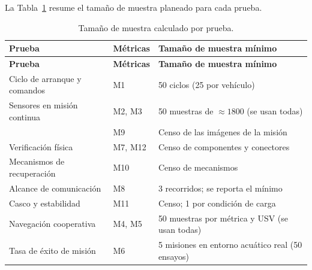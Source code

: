 \newpage

La Tabla~\ref{tab:muestras} resume el tamaño de muestra planeado para cada prueba.

\begin{longtable}{|p{4.6cm}|>{\centering\arraybackslash}p{2cm}|p{6.2cm}|}
\caption{Tamaño de muestra calculado por prueba.}
\label{tab:muestras} \\
\hline
\textbf{Prueba} & \textbf{Métricas} & \textbf{Tamaño de muestra mínimo} \\
\hline
\endfirsthead
\hline
\textbf{Prueba} & \textbf{Métricas} & \textbf{Tamaño de muestra mínimo} \\
\hline
\endhead
Ciclo de arranque y comandos & M1 & 50 ciclos (25 por vehículo) \\ \hline
Sensores en misión continua & M2, M3 & 50 muestras de $\approx 1800$ (se usan todas) \\ \hline
 & M9 & Censo de las imágenes de la misión \\ \hline
Verificación física & M7, M12 & Censo de componentes y conectores \\ \hline
Mecanismos de recuperación & M10 & Censo de mecanismos \\ \hline
Alcance de comunicación & M8 & 3 recorridos; se reporta el mínimo \\ \hline
Casco y estabilidad & M11 & Censo; 1 por condición de carga \\ \hline
Navegación cooperativa & M4, M5 & 50 muestras por métrica y USV (se usan todas) \\ \hline
Tasa de éxito de misión & M6 & 5 misiones en entorno acuático real (50 ensayos) \\ \hline
\end{longtable}